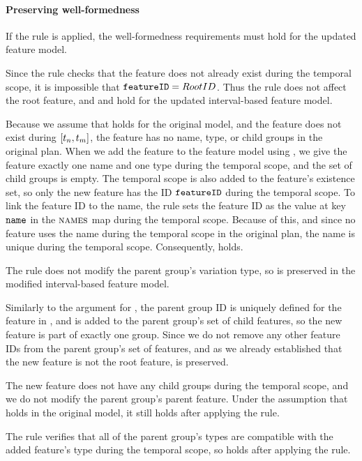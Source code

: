 \paragraph{Preserving well-formedness}

If the rule is applied, the well-formedness requirements must hold for the updated feature model. 

Since the rule checks that the feature does not already exist during the temporal scope, it is impossible that $\texttt{featureID} = RootID$. Thus the rule does not affect the root feature, and  and  hold for the updated interval-based feature model.

Because we assume that  holds for the original model, and the feature does not exist during $\interval{t_n}{t_m}$, the feature has no name, type, or child groups in the original plan. When we add the feature to the feature model using , we give the feature exactly one name and one type during the temporal scope, and the set of child groups is empty. The temporal scope is also added to the feature's existence set, so only the new feature has the ID $\texttt{featureID}$ during the temporal scope. To link the feature ID to the name, the rule sets the feature ID as the value at key $\texttt{name}$ in the $\textsc{names}{}$ map during the temporal scope. Because of this, and since no feature uses the name during the temporal scope in the original plan, the name is unique during the temporal scope.
Consequently,  holds.

The rule does not modify the parent group's variation type, so  is preserved in the modified interval-based feature model.

Similarly to the argument for , the parent group ID is uniquely defined for the feature in , and  is added to the parent group's set of child features, so the new feature is part of exactly one group. Since we do not remove any other feature IDs from the parent group's set of features, and as we already established that the new feature is not the root feature,  is preserved.

The new feature does not have any child groups during the temporal scope, and we do not modify the parent group's parent feature. Under the assumption that  holds in the original model, it still holds after applying the  rule.

The rule verifies that all of the parent group's types are compatible with the added feature's type during the temporal scope, so  holds after applying the rule.

